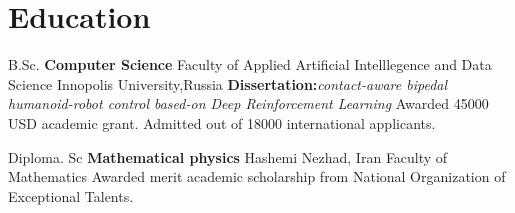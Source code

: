 \section{Education}
        \cventry{}
                {B.Sc. \textbf{Computer Science}}
                {Faculty of Applied Artificial Intelllegence and Data Science}
                {Innopolis University,Russia}
                {\textbf{Dissertation:}\textit{contact-aware bipedal humanoid-robot control based-on Deep Reinforcement Learning} 
                }
                {
                Awarded 45000 USD academic grant. Admitted out of 18000 international applicants.
                }
  
    \vspace{10pt}
    
    \cventry{}
            {Diploma. Sc \textbf{Mathematical physics}}
            {Hashemi Nezhad, Iran}
            {Faculty of Mathematics}
            {Awarded merit academic scholarship from National Organization of Exceptional Talents. }
            {}
